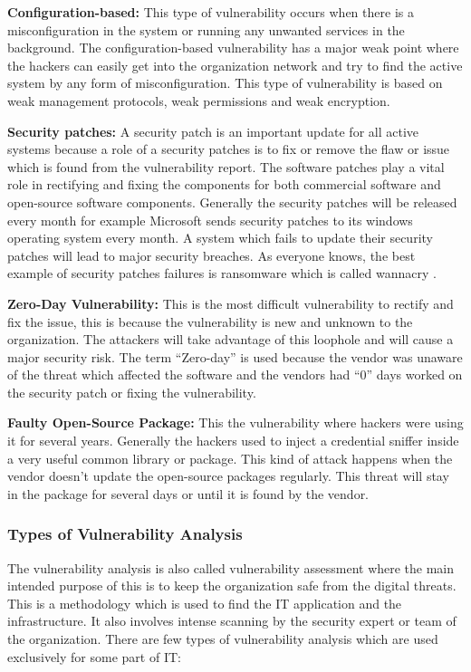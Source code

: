 	\textbf{Configuration-based:} This type of vulnerability occurs when there is a misconfiguration in the system or running any unwanted services in the background. The configuration-based vulnerability has a major weak point where the hackers can easily get into the organization network and try to find the active system by any form of misconfiguration. This type of vulnerability is based on weak management protocols, weak permissions and weak encryption.
	
	\textbf{Security patches:} A security patch is an important update for all active systems because a role of a security patches is to fix or remove the flaw or issue which is found from the vulnerability report. The software patches play a vital role in rectifying and fixing the components for both commercial software and open-source software components. Generally the security patches will be released every month for example Microsoft sends security patches to its windows operating system every month. A system which fails to update their security patches will lead to major security breaches. As everyone knows, the best example of security patches failures is ransomware which is called wannacry \cite{Kaspersky}.
	
	\textbf{Zero-Day Vulnerability:} This is the most difficult vulnerability to rectify and fix the issue, this is because the vulnerability is new and unknown to the organization. The attackers will take advantage of this loophole and will cause a major security risk. The term “Zero-day” is used because the vendor was unaware of the threat which affected the software and the vendors had “0” days worked on the security patch or fixing the vulnerability.
	
	\textbf{Faulty Open-Source Package:} This the vulnerability where hackers were using it for several years. Generally the hackers used to inject a credential sniffer inside a very useful common library or package. This kind of attack happens when the vendor doesn’t update the open-source packages regularly. This threat will stay in the package for several days or until it is found by the vendor.


\subsubsection{Types of Vulnerability Analysis}
The vulnerability analysis is also called vulnerability assessment where the main intended purpose of this is to keep the organization safe from the digital threats. This is a methodology which is used to find the IT application and the infrastructure. It also involves intense scanning by the security expert or team of the organization. There are few types of vulnerability analysis which are used exclusively for some part of IT:

